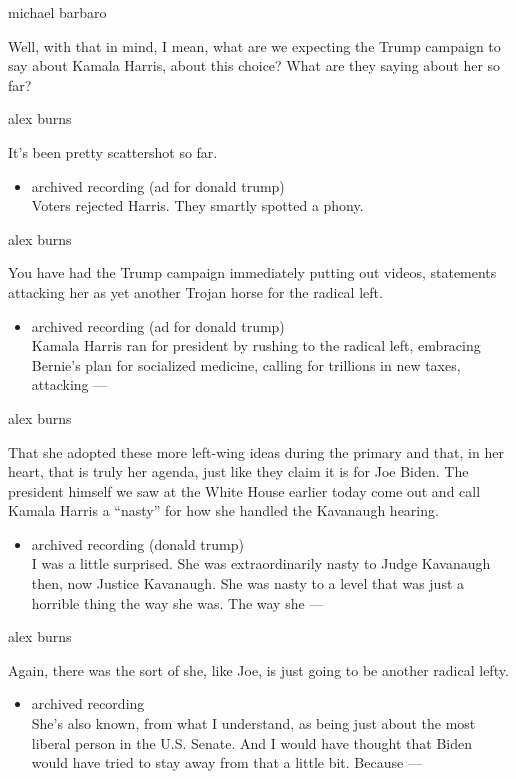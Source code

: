 michael barbaro

Well, with that in mind, I mean, what are we expecting the Trump
campaign to say about Kamala Harris, about this choice? What are they
saying about her so far?

alex burns

It's been pretty scattershot so far.

\begin{itemize}
\tightlist
\item
  archived recording (ad for donald trump)\\
  Voters rejected Harris. They smartly spotted a phony.
\end{itemize}

alex burns

You have had the Trump campaign immediately putting out videos,
statements attacking her as yet another Trojan horse for the radical
left.

\begin{itemize}
\tightlist
\item
  archived recording (ad for donald trump)\\
  Kamala Harris ran for president by rushing to the radical left,
  embracing Bernie's plan for socialized medicine, calling for trillions
  in new taxes, attacking ---
\end{itemize}

alex burns

That she adopted these more left-wing ideas during the primary and that,
in her heart, that is truly her agenda, just like they claim it is for
Joe Biden. The president himself we saw at the White House earlier today
come out and call Kamala Harris a ``nasty'' for how she handled the
Kavanaugh hearing.

\begin{itemize}
\tightlist
\item
  archived recording (donald trump)\\
  I was a little surprised. She was extraordinarily nasty to Judge
  Kavanaugh then, now Justice Kavanaugh. She was nasty to a level that
  was just a horrible thing the way she was. The way she ---
\end{itemize}

alex burns

Again, there was the sort of she, like Joe, is just going to be another
radical lefty.

\begin{itemize}
\tightlist
\item
  archived recording\\
  She's also known, from what I understand, as being just about the most
  liberal person in the U.S. Senate. And I would have thought that Biden
  would have tried to stay away from that a little bit. Because ---
\end{itemize}

